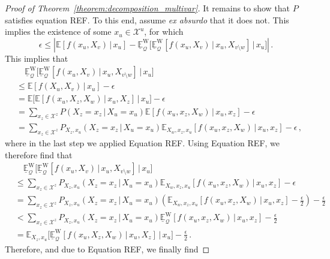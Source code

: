 \documentclass[10pt]{paper}
\theoremstyle{definition}
\newcommand{\states}{\mathcal{X}}
\newcommand{\rateset}{\mathcal{Q}}
\newcommand{\abs}[1]{\left\vert #1 \right\vert}
\begin{document}
\begin{proof}[Proof of Theorem~\ref{theorem:decomposition_multivar}]
It remains to show that $P$ satisfies equation REF. To this end, assume \emph{ex absurdo} that it does not. This implies the existence of some $x_u\in\states^u$, for which
\begin{equation*}
\epsilon \leq \abs{\mathbb{E}\left[f(x_u,X_v)\,\vert\,x_u\right] - \underline{\mathbb{E}}^{\mathrm{W}}_\rateset\bigl[\underline{\mathbb{E}}^{\mathrm{W}}_\rateset\left[f(x_u,X_v)\,\vert\,x_u,X_{v\setminus w}\right]\,\vert\,x_u\bigr]}\,.
\end{equation*}
This implies that
\begin{align*}
 &\quad \underline{\mathbb{E}}^{\mathrm{W}}_\rateset\bigl[\underline{\mathbb{E}}^{\mathrm{W}}_\rateset\left[f(x_u,X_v)\,\vert\,x_u,X_{v\setminus w}\right]\,\vert\,x_u\bigr] \\
 &\leq \mathbb{E}\left[f(X_u,X_v)\,\vert\,x_u\right] - \epsilon \\
 &= \mathbb{E}\bigl[\mathbb{E}[f(x_u,X_z,X_w)\,\vert\,x_u,X_z]\,\big\vert\,x_u\bigr] - \epsilon \\
 &= \sum_{x_z\in\states^z}P(X_z=x_z\,\vert\,X_u=x_u)\mathbb{E}[f(x_u,x_z,X_w)\,\vert\,x_u,x_z] - \epsilon \\
 &= \sum_{x_z\in\states^z}P_{X_z,x_u}(X_z=x_z\,\vert\,X_u=x_u)\mathbb{E}_{X_w,x_z,x_u}[f(x_u,x_z,X_w)\,\vert\,x_u,x_z] - \epsilon\,,
\end{align*}
where in the last step we applied Equation REF. Using Equation REF, we therefore find that
\begin{align*}
 &\quad \underline{\mathbb{E}}^{\mathrm{W}}_\rateset\bigl[\underline{\mathbb{E}}^{\mathrm{W}}_\rateset\left[f(x_u,X_v)\,\vert\,x_u,X_{v\setminus w}\right]\,\vert\,x_u\bigr] \\
 &\leq \sum_{x_z\in\states^z}P_{X_z,x_u}(X_z=x_z\,\vert\,X_u=x_u)\mathbb{E}_{X_w,x_z,x_u}[f(x_u,x_z,X_w)\,\vert\,x_u,x_z] - \epsilon \\
 &= \sum_{x_z\in\states^z}P_{X_z,x_u}(X_z=x_z\,\vert\,X_u=x_u)\left(\mathbb{E}_{X_w,x_z,x_u}[f(x_u,x_z,X_w)\,\vert\,x_u,x_z] - \frac{\epsilon}{2}\right) - \frac{\epsilon}{2} \\
 &< \sum_{x_z\in\states^z}P_{X_z,x_u}(X_z=x_z\,\vert\,X_u=x_u)\underline{\mathbb{E}}^{\mathrm{W}}_\rateset\left[f(x_u,x_z,X_w)\,\vert\,x_u,x_z\right] - \frac{\epsilon}{2} \\
 &= \mathbb{E}_{X_z,x_u}\bigl[\underline{\mathbb{E}}^{\mathrm{W}}_\rateset\left[f(x_u,X_z,X_w)\,\vert\,x_u,X_z\right] \,\vert\,x_u\bigr] - \frac{\epsilon}{2}\,.
\end{align*}
Therefore, and due to Equation REF, we finally find

\end{proof}
\end{document}
